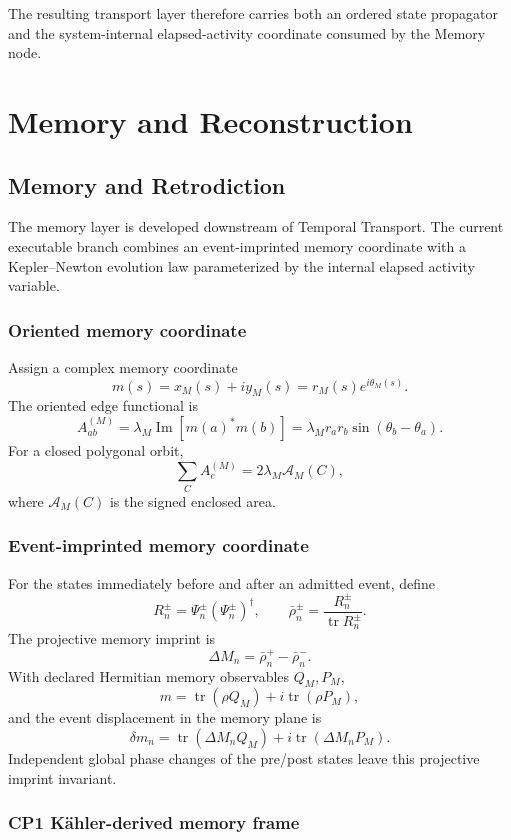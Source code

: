\documentclass[11pt]{book}
\begin{document}
The resulting transport layer therefore carries both an ordered state propagator and the system-internal elapsed-activity coordinate consumed by the Memory node.

\part{Memory and Reconstruction}
\chapter{Memory and Retrodiction}

The memory layer is developed downstream of Temporal Transport. The current executable branch combines an event-imprinted memory coordinate with a Kepler--Newton evolution law parameterized by the internal elapsed activity variable.

\section{Oriented memory coordinate}

Assign a complex memory coordinate
\[
m(s)=x_M(s)+iy_M(s)=r_M(s)e^{i\theta_M(s)}.
\]
The oriented edge functional is
\[
\boxed{
A^{(M)}_{ab}
=\lambda_M\operatorname{Im}[m(a)^*m(b)]
=\lambda_M r_a r_b\sin(\theta_b-\theta_a).
}
\]
For a closed polygonal orbit,
\[
\sum_C A^{(M)}_e
=2\lambda_M\mathcal A_M(C),
\]
where \(\mathcal A_M(C)\) is the signed enclosed area.

\section{Event-imprinted memory coordinate}

For the states immediately before and after an admitted event, define
\[
R_n^\pm=\Psi_n^\pm(\Psi_n^\pm)^\dagger,
\qquad
\bar\rho_n^\pm=\frac{R_n^\pm}{\operatorname{tr}R_n^\pm}.
\]
The projective memory imprint is
\[
\boxed{\Delta M_n=\bar\rho_n^+-\bar\rho_n^-}.
\]
With declared Hermitian memory observables \(Q_M,P_M\),
\[
m=\operatorname{tr}(\rho Q_M)+i\operatorname{tr}(\rho P_M),
\]
and the event displacement in the memory plane is
\[
\boxed{
\delta m_n
=\operatorname{tr}(\Delta M_nQ_M)
+i\operatorname{tr}(\Delta M_nP_M).
}
\]
Independent global phase changes of the pre/post states leave this projective imprint invariant.

\section{CP1 K\"ahler-derived memory frame}
\end{document}
